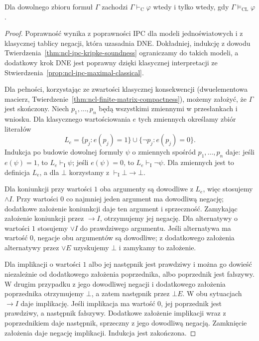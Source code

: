 \begin{twierdzenie}
\label{thm:ncl-ipc-classical-extension}
Dla dowolnego zbioru formuł $\Gamma$ zachodzi
$\Gamma\vdash_{\mathrm C}\varphi$ wtedy i tylko wtedy,
gdy $\Gamma\models_{\mathrm{CL}}\varphi$.
\end{twierdzenie}
\begin{proof}
Poprawność wynika z poprawności IPC dla modeli
jednoświatowych i z klasycznej tablicy negacji,
która uzasadnia DNE. Dokładniej, indukcję
z dowodu Twierdzenia~\ref{thm:ncl-ipc-kripke-soundness}
ograniczamy do takich modeli, a dodatkowy krok
DNE jest poprawny dzięki klasycznej interpretacji
ze Stwierdzenia~\ref{prop:ncl-ipc-maximal-classical}.

Dla pełności, korzystając ze zwartości klasycznej
konsekwencji (dwuelementowa macierz,
Twierdzenie~\ref{thm:ncl-finite-matrix-compactness}),
możemy założyć, że $\Gamma$ jest skończony.
Niech $p_1,\ldots,p_n$ będą wszystkimi zmiennymi
w przesłankach i wniosku.
Dla klasycznego wartościowania $e$ tych zmiennych
określamy zbiór literałów
\[
 L_e=\{p_j:e(p_j)=1\}\cup
     \{\neg p_j:e(p_j)=0\}.
\]
Indukcja po budowie dowolnej formuły $\psi$
o zmiennych spośród $p_1,\ldots,p_n$ daje:
jeśli $e(\psi)=1$, to $L_e\vdash_{\mathrm I}\psi$;
jeśli $e(\psi)=0$, to $L_e\vdash_{\mathrm I}\neg\psi$.
Dla zmiennych jest to definicja $L_e$, a dla $\bot$
korzystamy z $\vdash_{\mathrm I}\bot\to\bot$.

Dla koniunkcji przy wartości $1$ oba argumenty
są dowodliwe z $L_e$, więc stosujemy $\wedge I$.
Przy wartości $0$ co najmniej jeden argument
ma dowodliwą negację; dodatkowe założenie
koniunkcji daje ten argument i sprzeczność.
Zamykając założenie koniunkcji przez $\to I$,
otrzymujemy jej negację.
Dla alternatywy o wartości $1$ stosujemy
$\vee I$ do prawdziwego argumentu. Jeśli
alternatywa ma wartość $0$, negacje obu
argumentów są dowodliwe; z dodatkowego
założenia alternatywy przez $\vee E$ uzyskujemy
$\bot$ i zamykamy to założenie.

Dla implikacji o wartości $1$ albo jej następnik
jest prawdziwy i można go dowieść niezależnie
od dodatkowego założenia poprzednika, albo
poprzednik jest fałszywy. W drugim przypadku
z jego dowodliwej negacji i dodatkowego
założenia poprzednika otrzymujemy $\bot$,
a zatem następnik przez $\bot E$.
W obu sytuacjach $\to I$ daje implikację.
Jeśli implikacja ma wartość $0$, jej poprzednik
jest prawdziwy, a następnik fałszywy.
Dodatkowe założenie implikacji wraz z poprzednikiem
daje następnik, sprzeczny z jego dowodliwą negacją.
Zamknięcie założenia daje negację implikacji.
Indukcja jest zakończona.


\end{proof}
